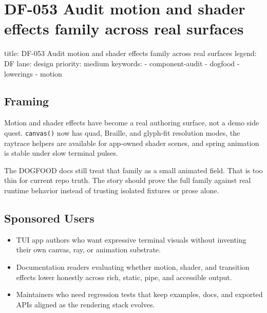 \chapter{DF-053 Audit motion and shader effects family across real surfaces}\label{record-098}

\smallskip

\begin{RecordMeta}
title: DF-053 Audit motion and shader effects family across real surfaces
legend: DF
lane: design
priority: medium
keywords:
  - component-audit
  - dogfood
  - lowerings
  - motion

\end{RecordMeta}

\section{Framing}\label{record-098-framing}

Motion and shader effects have become a real authoring surface, not a demo side quest. \texttt{c\allowbreak{}a\allowbreak{}n\allowbreak{}v\allowbreak{}a\allowbreak{}s\allowbreak{}(\allowbreak{})} now has quad, Braille, and glyph-fit resolution modes, the raytrace helpers are available for app-owned shader scenes, and spring animation is stable under slow terminal pulses.

The DOGFOOD docs still treat that family as a small animated field. That is too thin for current repo truth. The story should prove the full family against real runtime behavior instead of trusting isolated fixtures or prose alone.

\section{Sponsored Users}\label{record-098-sponsored-users}

\begin{itemize}
\tightlist
\item
  TUI app authors who want expressive terminal visuals without inventing their own canvas, ray, or animation substrate.
\item
  Documentation readers evaluating whether motion, shader, and transition effects lower honestly across rich, static, pipe, and accessible output.
\item
  Maintainers who need regression tests that keep examples, docs, and exported APIs aligned as the rendering stack evolves.
\end{itemize}

